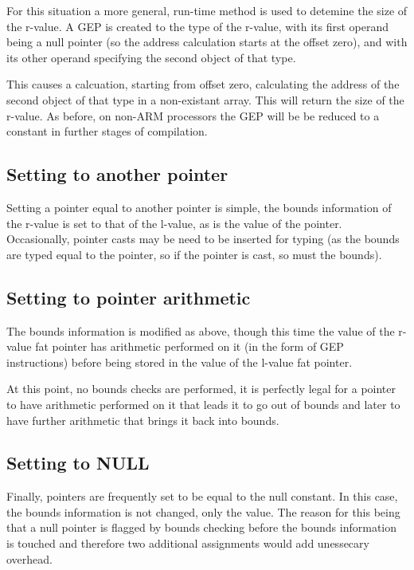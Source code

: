 For this situation a more general, run-time method is used to detemine the size of the r-value.
A GEP is created to the type of the r-value, with its first operand being a null pointer (so the address calculation starts at the offset zero), and with its other operand specifying the second object of that type.

This causes a calcuation, starting from offset zero, calculating the address of the second object of that type in a non-existant array.
This will return the size of the r-value.
As before, on non-ARM processors the GEP will be be reduced to a constant in further stages of compilation.

\subsection{Setting to another pointer}

Setting a pointer equal to another pointer is simple, the bounds information of the r-value is set to that of the l-value, as is the value of the pointer.
Occasionally, pointer casts may be need to be inserted for typing (as the bounds are typed equal to the pointer, so if the pointer is cast, so must the bounds).

\subsection{Setting to pointer arithmetic}

The bounds information is modified as above, though this time the value of the r-value fat pointer has arithmetic performed on it (in the form of GEP instructions) before being stored in the value of the l-value fat pointer.

At this point, no bounds checks are performed, it is perfectly legal for a pointer to have arithmetic performed on it that leads it to go out of bounds and later to have further arithmetic that brings it back into bounds.

\subsection{Setting to NULL}

Finally, pointers are frequently set to be equal to the null constant.
In this case, the bounds information is not changed, only the value.
The reason for this being that a null pointer is flagged by bounds checking before the bounds information is touched and therefore two additional assignments would add unessecary overhead.

